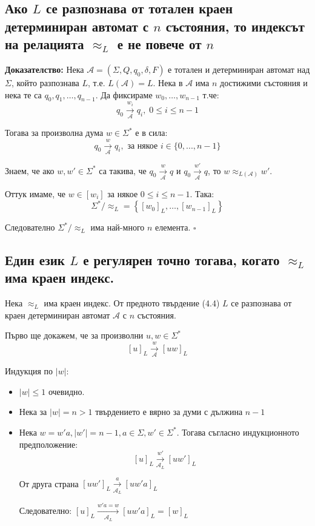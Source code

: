 \documentclass{article}
\renewcommand{\\}{\newline}
\newcommand{\doc}{\textbf{Доказателство: }}
\newcommand{\proven}{\hfill $\square$}
\begin{document}
    \subsection{Ако \(L\) се разпознава от тотален краен детерминиран автомат с \(n\) състояния, то индексът на релацията \(\approx_{L}\) е не повече от \(n\)} 
    \doc Нека \(\mathcal{A} = (\Sigma, Q, q_0, \delta, F)\) е тотален и детерминиран автомат над \(\Sigma\), който разпознава \(L\), т.е. \(L(\mathcal{A}) = L\). Нека в \(\mathcal{A}\) има \(n\) достижими състояния и нека те са \(q_0, q_1,\dots, q_{n-1}\).  Да фиксираме \(w_0, \dots, w_{n-1}\) т.че: \[
      q_{0} \overset{w_i}{\underset{\mathcal{A}}{\rightarrow}} q_i,\; 0 \leq i \leq n-1
    \]         

    Тогава за произволна дума \(w \in \Sigma^{*}\) е в сила: \[
      q_{0} \overset{w}{\underset{\mathcal{A}}{\rightarrow}} q_i,\text{ за някое }i \in \{0,..., n-1\}
    \]   

    Знаем, че ако \(w, w' \in \Sigma^{*}\) са такива, че \(    q_{0} \overset{w}{\underset{\mathcal{A}}{\rightarrow}} q \text{ и }q_{0} \overset{w'}{\underset{\mathcal{A}}{\rightarrow}} q \), то \(w \approx_{L(\mathcal{A})} w'\).

    Оттук имаме, че \(w \in [w_{i}]\) за някое \(0 \leq i \leq n-1\). Така: \[
      \Sigma^{*}/\approx_{L} = \left\{[w_0]_{L},\dots, [w_{n-1}]_{L}\right\}
    \]    

    Следователно \(\Sigma^{*}/\approx_{L}\) има най-много \(n\) елемента.  \proven 

    \subsection{Един език \(L\) е регулярен точно тогава, когато \(\approx_{L}\) има краен индекс.}  
    Нека \(\approx_{L}\) има краен индекс. От предното твърдение (4.4) \(L\) се разпознава от краен детерминиран автомат \(\mathcal{A}\) с \(n\) състояния.    

    Първо ще докажем, че за произволни \(u, w \in \Sigma^{*}\) \[
      [u]_{L} \overset{w}{\underset{\mathcal{A}}{\rightarrow}} [uw]_{L}
    \]   

    Индукция по \(|w|\):
    \begin{itemize}
        \item \(|w| \leq 1\) очевидно. 
        \item Нека за \(|w| = n > 1\) твърдението е вярно за думи с дължина \(n-1\) 
        \item Нека \(w = w'a, |w'| = n - 1, a \in \Sigma, w' \in \Sigma^{*}\). Тогава съгласно индукционното предположение: \[
            [u]_{L}  \overset{w'}{\underset{\mathcal{A}_L}{\rightarrow}} [uw']_{L}
        \]   

    От друга страна \([uw']_{L} \overset{a}{\underset{\mathcal{A}_L}{\rightarrow}} [uw'a]_{L}\)

    Следователно: \([u]_{L} \overset{w'a = w}{\underset{\mathcal{A}_L}{\rightarrow}} [uw'a]_{L} = [w]_{L}\)
\end{itemize}
\end{document}
